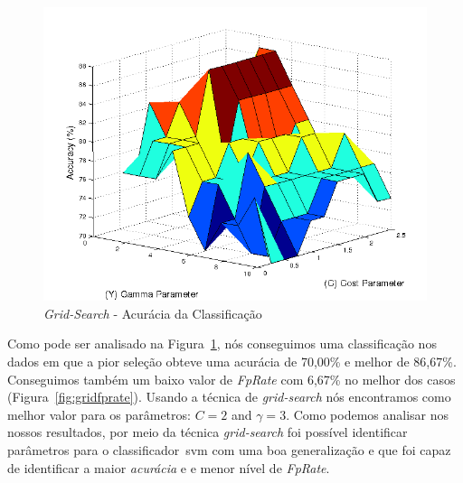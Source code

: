 \begin{figure}[!h]
 \centering
 \includegraphics[scale=0.7]{./img/gridsearch.png}
\caption{\textit{Grid-Search} - Acurácia da Classificação}
 \label{fig:gridaccuracy}
\end{figure}



% 
Como pode ser analisado na Figura~\ref{fig:gridaccuracy}, nós conseguimos uma classificação nos dados em que a pior seleção obteve uma acurácia de 70,00\% e melhor de 86,67\%. Conseguimos também um baixo valor de \textit{FpRate} com 6,67\% no melhor dos casos (Figura~\ref{fig:gridfprate}). Usando a técnica de \textit{grid-search} nós encontramos como melhor valor para os parâmetros: $C = 2$ and $\gamma = 3$. Como podemos analisar nos nossos resultados, por meio da técnica \textit{grid-search} foi possível identificar parâmetros para o classificador~\ac{svm} com uma boa generalização e que foi capaz de identificar a maior \textit{acurácia} e e menor nível de \textit{FpRate}.


